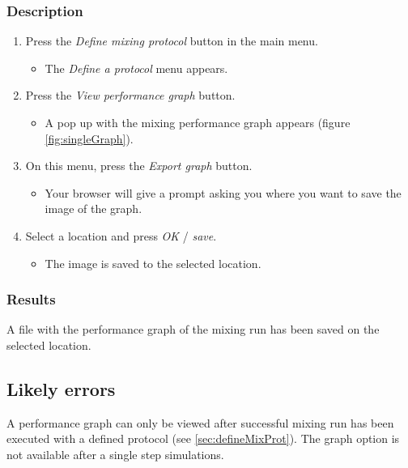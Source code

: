 \subsubsection{Description}
\begin{enumerate}
	\item  Press the \emph{Define mixing protocol} button in the main menu.
		\begin{itemize}
            		\item The \emph{Define a protocol} menu appears.
		\end{itemize}
			\item Press the \emph{View performance graph} button.
		\begin{itemize}
            		\item A pop up with the mixing performance graph appears (figure \ref{fig:singleGraph}).
		\end{itemize}


    \item On this menu, press the \emph{Export graph} button.
		\begin{itemize}
             \item Your browser will give a prompt asking you where you want to save the image of the graph.
		\end{itemize}
    \item  Select a location and press \emph{OK} / \emph{save}.
		\begin{itemize}
           \item The image is saved to the selected location.
		\end{itemize}
\end{enumerate}

\subsubsection{Results}
A file with the performance graph of the mixing run has been saved on the selected location.

\subsection{Likely errors}
A performance graph can only be viewed after successful mixing run has been executed with a defined protocol (see \ref{sec:defineMixProt}). The graph option is not available after a single step simulations.

